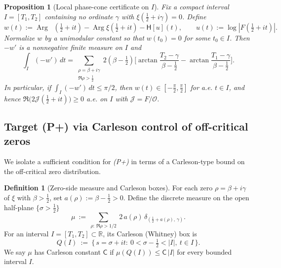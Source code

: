 \documentclass[11pt]{article}
\newtheorem{proposition}[theorem]{Proposition}
\theoremstyle{definition}
\newtheorem{definition}[theorem]{Definition}
\theoremstyle{remark}
\newcommand{\R}{\mathbb{R}}
\DeclareMathOperator{\dettwo}{det_2}
\DeclareMathOperator{\Arg}{Arg}
\begin{document}
\begin{proposition}[Local phase-cone certificate on \(I\)]
Fix a compact interval $I=[T_1,T_2]$ containing no ordinate \(\gamma\) with \(\xi(\tfrac12+i\gamma)=0\). Define
\[
 w(t):=\Arg\dettwo(\tfrac12+it)-\Arg\xi(\tfrac12+it)-\mathsf H[u](t),\qquad u(t):=\log|F(\tfrac12+it)|.
\]
Normalize $w$ by a unimodular constant so that $w(t_0)=0$ for some $t_0\in I$. Then $-w'$ is a nonnegative finite measure on $I$ and
\[
 \int_I (-w')\,dt=\sum_{\substack{\rho=\beta+i\gamma\\ \Re\rho>\tfrac12}}\! 2(\beta-\tfrac12)\Big[\arctan\frac{T_2-\gamma}{\beta-\tfrac12}-\arctan\frac{T_1-\gamma}{\beta-\tfrac12}\Big].
\]
In particular, if \(\displaystyle \int_I (-w')\,dt\le \pi/2\), then $w(t)\in[-\tfrac\pi2,\tfrac\pi2]$ for a.e. $t\in I$, and hence \(\Re\big(2\mathcal J(\tfrac12+it)\big)\ge 0\) a.e. on $I$ with \(\mathcal J=F/\mathcal O\).
\end{proposition}
\subsection*{Target (P+) via Carleson control of off-critical zeros}\label{subsec:Pplus-Carleson}
We isolate a sufficient condition for \emph{(P+)} in terms of a Carleson-type bound on the off-critical zero distribution.

\begin{definition}[Zero-side measure and Carleson boxes]
For each zero \(\rho=\beta+i\gamma\) of \(\xi\) with \(\beta>\tfrac12\), set \(a(\rho):=\beta-\tfrac12>0\). Define the discrete measure on the open half-plane \(\{\sigma>\tfrac12\}\)
\[
 \mu\ :=\ \sum_{\rho:\,\Re\rho>1/2}\ 2\,a(\rho)\,\delta_{(\tfrac12+a(\rho),\,\gamma)}.
\]
For an interval \(I=[T_1,T_2]\subset\R\), its Carleson (Whitney) box is
\[
 Q(I)\ :=\ \Big\{\, s=\sigma+it:\ 0<\sigma-\tfrac12<|I|,\ t\in I\,\Big\}.
\]
We say \(\mu\) has Carleson constant \(\mathsf C\) if \(\mu(Q(I))\le \mathsf C\,|I|\) for every bounded interval \(I\).
\end{definition}
\end{document}
